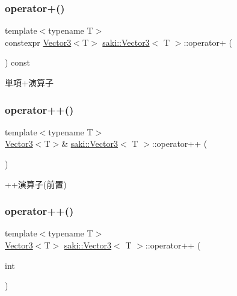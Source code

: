 \subsubsection{\texorpdfstring{operator+()}{operator+()}}
{\footnotesize\ttfamily template$<$typename T$>$ \\
constexpr \mbox{\hyperlink{classsaki_1_1_vector3}{Vector3}}$<$T$>$ \mbox{\hyperlink{classsaki_1_1_vector3}{saki\+::\+Vector3}}$<$ T $>$\+::operator+ (\begin{DoxyParamCaption}{ }\end{DoxyParamCaption}) const\hspace{0.3cm}{\ttfamily [inline]}}



単項+演算子 

\mbox{\label{classsaki_1_1_vector3_a54f37380741717a26c25aba7645a909d}} 
\subsubsection{\texorpdfstring{operator++()}{operator++()}\hspace{0.1cm}{\footnotesize\ttfamily [1/2]}}
{\footnotesize\ttfamily template$<$typename T$>$ \\
\mbox{\hyperlink{classsaki_1_1_vector3}{Vector3}}$<$T$>$\& \mbox{\hyperlink{classsaki_1_1_vector3}{saki\+::\+Vector3}}$<$ T $>$\+::operator++ (\begin{DoxyParamCaption}{ }\end{DoxyParamCaption})\hspace{0.3cm}{\ttfamily [inline]}}



++演算子(前置) 

\mbox{\label{classsaki_1_1_vector3_a8ecd6192153cb65e169821917285fae0}} 
\subsubsection{\texorpdfstring{operator++()}{operator++()}\hspace{0.1cm}{\footnotesize\ttfamily [2/2]}}
{\footnotesize\ttfamily template$<$typename T$>$ \\
\mbox{\hyperlink{classsaki_1_1_vector3}{Vector3}}$<$T$>$ \mbox{\hyperlink{classsaki_1_1_vector3}{saki\+::\+Vector3}}$<$ T $>$\+::operator++ (\begin{DoxyParamCaption}\item[{int}]{ }\end{DoxyParamCaption})\hspace{0.3cm}{\ttfamily [inline]}}



